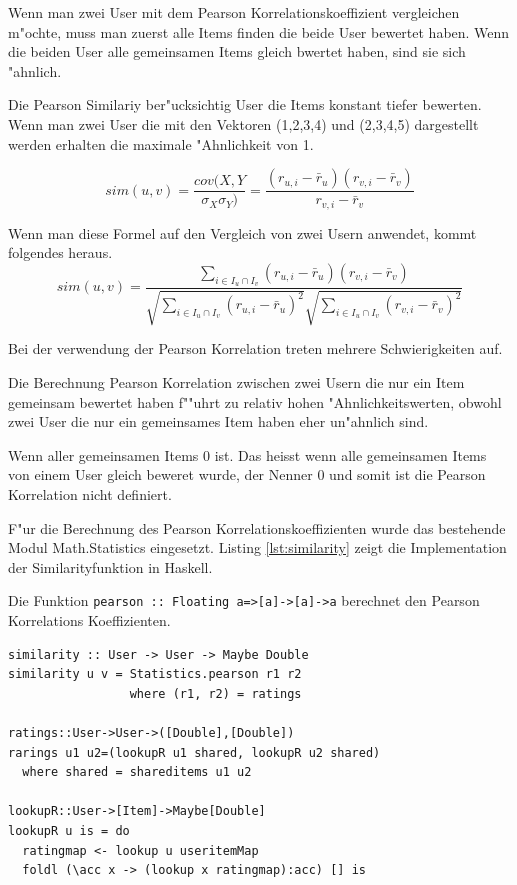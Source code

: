 \documentclass[a4paper, 12pt]{article}
\begin{document}
Wenn man zwei User mit dem Pearson Korrelationskoeffizient vergleichen m"ochte, muss man zuerst alle Items finden die beide User bewertet haben. Wenn die beiden User alle gemeinsamen Items gleich bwertet haben, sind sie sich "ahnlich.

Die Pearson Similariy ber"ucksichtig User die Items konstant tiefer bewerten. Wenn man zwei User die mit den Vektoren (1,2,3,4) und (2,3,4,5) dargestellt werden erhalten die maximale "Ahnlichkeit von 1.

\begin{equation}
 sim(u,v) = \frac{cov(X,Y}{\sigma_X \sigma_Y)} = \frac{(r_{u,i} - \bar{r}_u)(r_{v,i} - \bar{r}_v)}{r_{v,i} - \bar{r}_v}    
\end{equation}

Wenn man diese Formel auf den Vergleich von zwei Usern anwendet, kommt folgendes heraus.
\begin{equation}
 sim(u,v) = \frac{\sum_{i \in I_u \cap I_v} (r_{u,i} - \bar{r}_u)(r_{v,i} - \bar{r}_v)}{\sqrt{\sum_{i \in I_u \cap I_v}(r_{u,i} - \bar{r}_u)^2}\sqrt{\sum_{i \in I_u \cap I_v}(r_{v,i} - \bar{r}_v)^2}}
\end{equation}

Bei der verwendung der Pearson Korrelation treten mehrere Schwierigkeiten auf.

Die Berechnung Pearson Korrelation zwischen zwei Usern die nur ein Item gemeinsam bewertet haben f""uhrt zu relativ hohen "Ahnlichkeitswerten, obwohl zwei User die nur ein gemeinsames Item haben eher un"ahnlich sind.

Wenn aller gemeinsamen Items 0 ist. Das heisst wenn alle gemeinsamen Items von einem User gleich beweret wurde, der Nenner 0 und somit ist die Pearson Korrelation nicht definiert.

F"ur die Berechnung des Pearson Korrelationskoeffizienten wurde das bestehende Modul Math.Statistics eingesetzt. Listing \ref{lst:similarity} zeigt die Implementation der Similarityfunktion in Haskell.

Die Funktion \verb|pearson :: Floating a=>[a]->[a]->a| berechnet den Pearson Korrelations Koeffizienten.

\begin{lstlisting}[caption=Similarity, label=lst:similarity]
similarity :: User -> User -> Maybe Double
similarity u v = Statistics.pearson r1 r2
                 where (r1, r2) = ratings

ratings::User->User->([Double],[Double])
rarings u1 u2=(lookupR u1 shared, lookupR u2 shared)
  where shared = shareditems u1 u2

lookupR::User->[Item]->Maybe[Double]
lookupR u is = do
  ratingmap <- lookup u useritemMap
  foldl (\acc x -> (lookup x ratingmap):acc) [] is
\end{lstlisting}
\end{document}
